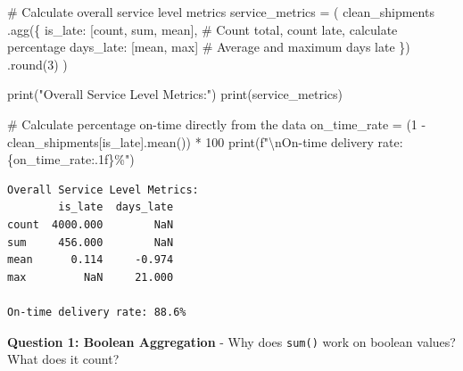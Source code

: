 \documentclass[
]{article}
\newenvironment{Shaded}{\begin{snugshade}}{\end{snugshade}}
\newcommand{\BuiltInTok}[1]{\textcolor[rgb]{0.00,0.23,0.31}{#1}}
\newcommand{\CharTok}[1]{\textcolor[rgb]{0.13,0.47,0.30}{#1}}
\newcommand{\CommentTok}[1]{\textcolor[rgb]{0.37,0.37,0.37}{#1}}
\newcommand{\DecValTok}[1]{\textcolor[rgb]{0.68,0.00,0.00}{#1}}
\newcommand{\NormalTok}[1]{\textcolor[rgb]{0.00,0.23,0.31}{#1}}
\newcommand{\OperatorTok}[1]{\textcolor[rgb]{0.37,0.37,0.37}{#1}}
\newcommand{\SpecialCharTok}[1]{\textcolor[rgb]{0.37,0.37,0.37}{#1}}
\newcommand{\SpecialStringTok}[1]{\textcolor[rgb]{0.13,0.47,0.30}{#1}}
\newcommand{\StringTok}[1]{\textcolor[rgb]{0.13,0.47,0.30}{#1}}
\begin{document}
\label{mental-model-5-aggregate}
\begin{Shaded}
\begin{Highlighting}[]
\CommentTok{\# Calculate overall service level metrics}
\NormalTok{service\_metrics }\OperatorTok{=}\NormalTok{ (}
\NormalTok{    clean\_shipments}
\NormalTok{    .agg(\{}
        \StringTok{\textquotesingle{}is\_late\textquotesingle{}}\NormalTok{: [}\StringTok{\textquotesingle{}count\textquotesingle{}}\NormalTok{, }\StringTok{\textquotesingle{}sum\textquotesingle{}}\NormalTok{, }\StringTok{\textquotesingle{}mean\textquotesingle{}}\NormalTok{],  }\CommentTok{\# Count total, count late, calculate percentage}
        \StringTok{\textquotesingle{}days\_late\textquotesingle{}}\NormalTok{: [}\StringTok{\textquotesingle{}mean\textquotesingle{}}\NormalTok{, }\StringTok{\textquotesingle{}max\textquotesingle{}}\NormalTok{]  }\CommentTok{\# Average and maximum days late}
\NormalTok{    \})}
\NormalTok{    .}\BuiltInTok{round}\NormalTok{(}\DecValTok{3}\NormalTok{)}
\NormalTok{)}

\BuiltInTok{print}\NormalTok{(}\StringTok{"Overall Service Level Metrics:"}\NormalTok{)}
\BuiltInTok{print}\NormalTok{(service\_metrics)}

\CommentTok{\# Calculate percentage on{-}time directly from the data}
\NormalTok{on\_time\_rate }\OperatorTok{=}\NormalTok{ (}\DecValTok{1} \OperatorTok{{-}}\NormalTok{ clean\_shipments[}\StringTok{\textquotesingle{}is\_late\textquotesingle{}}\NormalTok{].mean()) }\OperatorTok{*} \DecValTok{100}
\BuiltInTok{print}\NormalTok{(}\SpecialStringTok{f"}\CharTok{\textbackslash{}n}\SpecialStringTok{On{-}time delivery rate: }\SpecialCharTok{\{}\NormalTok{on\_time\_rate}\SpecialCharTok{:.1f\}}\SpecialStringTok{\%"}\NormalTok{)}
\end{Highlighting}
\end{Shaded}

\begin{verbatim}
Overall Service Level Metrics:
        is_late  days_late
count  4000.000        NaN
sum     456.000        NaN
mean      0.114     -0.974
max         NaN     21.000

On-time delivery rate: 88.6%
\end{verbatim}

\begin{tcolorbox}[enhanced jigsaw, colbacktitle=quarto-callout-important-color!10!white, toptitle=1mm, colframe=quarto-callout-important-color-frame, bottomtitle=1mm, colback=white, left=2mm, breakable, coltitle=black, bottomrule=.15mm, rightrule=.15mm, titlerule=0mm, opacityback=0, title=\textcolor{quarto-callout-important-color}{\faExclamation}\hspace{0.5em}{🤔 Discussion Questions: Aggregate Mental Model}, arc=.35mm, opacitybacktitle=0.6, toprule=.15mm, leftrule=.75mm]

\textbf{Question 1: Boolean Aggregation} - Why does \texttt{sum()} work
on boolean values? What does it count?

\end{tcolorbox}
\end{document}
